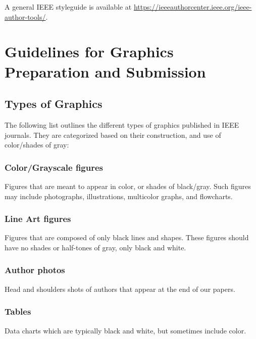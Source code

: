\documentclass{ieeeojies}
\begin{document}
A general IEEE styleguide is available at \underline{https://}\break\underline{ieeeauthorcenter.ieee.org/ieee-author-tools/}.

\section{Guidelines for Graphics Preparation and Submission}
\label{sec:guidelines}

\subsection{Types of Graphics}
The following list outlines the different types of graphics published in
IEEE journals. They are categorized based on their construction, and use of
color/shades of gray:

\subsubsection{Color/Grayscale figures}
{Figures that are meant to appear in color, or shades of black/gray. Such
figures may include photographs, illustrations, multicolor graphs, and
flowcharts.}

\subsubsection{Line Art figures}
{Figures that are composed of only black lines and shapes. These figures
should have no shades or half-tones of gray, only black and white.}

\subsubsection{Author photos}
{Head and shoulders shots of authors that appear at the end of our papers. }

\subsubsection{Tables}
{Data charts which are typically black and white, but sometimes include
color.}
\end{document}
